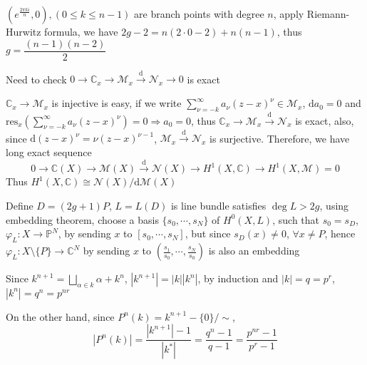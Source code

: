 \documentclass[../main.tex]{subfiles}
\begin{document}
\begin{problem}
$\left(e^{\frac{2\pi ki}{n}},0\right), (0\leq k\leq n-1)$ are branch points with degree $n$, apply Riemann-Hurwitz formula, we have $2g-2=n(2\cdot 0-2)+n(n-1)$, thus $g=\dfrac{(n-1)(n-2)}{2}$
\end{problem}

\begin{problem}
Need to check $0\rightarrow\mathbb{C}_x\rightarrow\mathcal{M}_x\overset{\mathrm{d}}{\rightarrow}\mathcal{N}_x\rightarrow0$ is exact \par
$\mathbb{C}_x\rightarrow\mathcal{M}_x$ is injective is easy, if we write $\displaystyle\sum_{\nu=-k}^\infty a_\nu(z-x)^\nu\in\mathcal{M}_x$, $\mathrm{d}a_0=0$ and $\displaystyle\mathrm{res}_x\left(\sum_{\nu=-k}^\infty a_\nu(z-x)^\nu\right)=0\Rightarrow a_0=0$, thus $\mathbb{C}_x\rightarrow\mathcal{M}_x\overset{\mathrm{d}}{\rightarrow}\mathcal{N}_x$ is exact, also, since $\mathrm{d}(z-x)^\nu=\nu(z-x)^{\nu-1}$, $\mathcal{M}_x\overset{\mathrm{d}}{\rightarrow}\mathcal{N}_x$ is surjective. Therefore, we have long exact sequence
\[
0\rightarrow\mathbb{C}(X)\rightarrow\mathcal{M}(X)\overset{\mathrm{d}}{\rightarrow}\mathcal{N}(X)\rightarrow H^1(X,\mathbb{C})\rightarrow H^1(X,\mathcal{M})=0
\]
Thus $H^1(X,\mathbb{C})\cong\mathcal{N}(X)/\mathrm{d}\mathcal{M}(X)$
\end{problem}

\begin{problem}

\end{problem}

\begin{problem}
Define $D=(2g+1)P$, $L=L(D)$ is line bundle satisfies $\deg L>2g$, using embedding theorem, choose a basis $\{s_0,\cdots,s_N\}$ of $H^0(X,L)$, such that $s_0=s_D$, $\varphi_L: X\rightarrow\mathbb{P}^N$, by sending $x$ to $[s_0,\cdots,s_N]$, but since $s_D(x)\neq 0$, $\forall x\neq P$, hence $\varphi_L: X\setminus\{P\}\rightarrow\mathbb{C}^N$ by sending $x$ to $\left(\frac{s_1}{s_0},\cdots,\frac{s_N}{s_0}\right)$ is also an embedding
\end{problem}

\begin{problem}
Since $\displaystyle k^{n+1}=\bigsqcup_{\alpha\in k}\alpha+k^n$, $|k^{n+1}|=|k||k^n|$, by induction and $|k|=q=p^r$, $|k^n|=q^n=p^{nr}$ \par
On the other hand, since $P^n(k)=k^{n+1}-\{0\}\big/\sim$, 
\[
|P^n(k)|=\dfrac{|k^{n+1}|-1}{|k^*|}=\dfrac{q^n-1}{q-1}=\dfrac{p^{nr}-1}{p^r-1}
\]
\end{problem}
\end{document}
